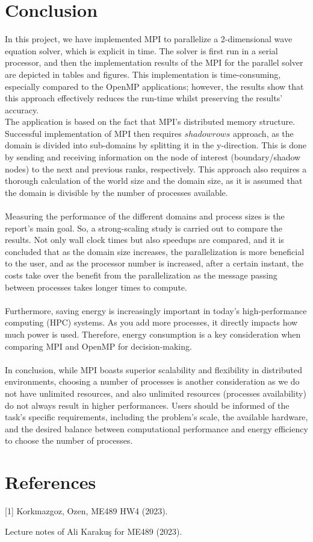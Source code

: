 \documentclass[12pt]{article}
\begin{document}
\clearpage

\section{Conclusion}
In this project, we have implemented MPI to parallelize a 2-dimensional wave equation solver, which is explicit in time. The solver is first run in a serial processor, and then the implementation results of the MPI for the parallel solver are depicted in tables and figures. This implementation is time-consuming, especially compared to the OpenMP applications; however, the results show that this approach effectively reduces the run-time whilst preserving the results' accuracy. \\

\noindent
The application is based on the fact that MPI's distributed memory structure. Successful implementation of MPI then requires $shadow rows$ approach, as the domain is divided into sub-domains by splitting it in the y-direction. This is done by sending and receiving information on the node of interest (boundary/shadow nodes) to the next and previous ranks, respectively. This approach also requires a thorough calculation of the world size and the domain size, as it is assumed that the domain is divisible by the number of processes available.\\\\

\noindent
Measuring the performance of the different domains and process sizes is the report's main goal. So, a strong-scaling study is carried out to compare the results. Not only wall clock times but also speedups are compared, and it is concluded that as the domain size increases, the parallelization is more beneficial to the user, and as the processor number is increased, after a certain instant, the costs take over the benefit from the parallelization as the message passing between processes takes longer times to compute.\\\\

\noindent
Furthermore, saving energy is increasingly important in today's high-performance computing (HPC) systems. As you add more processes, it directly impacts how much power is used. Therefore, energy consumption is a key consideration when comparing MPI and OpenMP for decision-making.\\\\

\noindent
In conclusion, while MPI boasts superior scalability and flexibility in distributed environments, choosing a number of processes is another consideration as we do not have unlimited resources, and also unlimited resources (processes availability) do not always result in higher performances. Users should be informed of the task's specific requirements, including the problem's scale, the available hardware, and the desired balance between computational performance and energy efficiency to choose the number of processes.
\noindent

\newpage
\section{References}
[1] Korkmazgoz, Ozen, ME489 HW4 (2023).

\noindent
[2] Lecture notes of Ali Karakuş for ME489 (2023).
\end{document}
